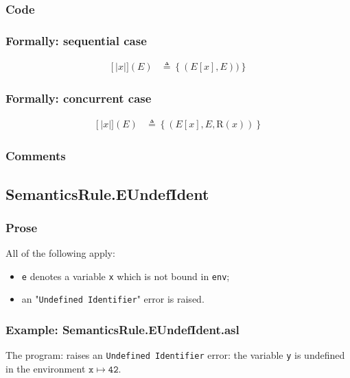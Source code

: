 \documentclass{book}
\newcommand\llbracket{[|}
\newcommand\rrbracket{|]}
\newcommand\interp[1]{\left\llbracket #1 \right\rrbracket}
\begin{document}
  \subsubsection{Code}

  \subsubsection{Formally: sequential case}
  \begin{align}
  \interp{x} (E) & \triangleq \left\{ (E[x], E)) \right\}
  \label{eq:sem-det-var}
  \end{align} 
 
  \subsubsection{Formally: concurrent case}
  \begin{align}
  \interp{x} (E) & \triangleq \left\{ (E[x], E, \text{R} (x)) \right\}
  \label{eq:sem-ndet-var}
  \end{align} 

  \subsubsection{Comments}

\subsection{SemanticsRule.EUndefIdent \label{sec:SemanticsRule.EUndefIdent}}

  \subsubsection{Prose}
  All of the following apply:
  \begin{itemize}
  \item \texttt{e} denotes a variable \texttt{x} which is not bound in \texttt{env};
  \item an "\texttt{Undefined Identifier}" error is raised.
  \end{itemize}

  \subsubsection{Example: SemanticsRule.EUndefIdent.asl}
    The program:
    raises an \texttt{Undefined Identifier} error: the variable \texttt{y} is
    undefined in the environment $\mathtt{x} \mapsto \mathtt{42}$.
\end{document}
